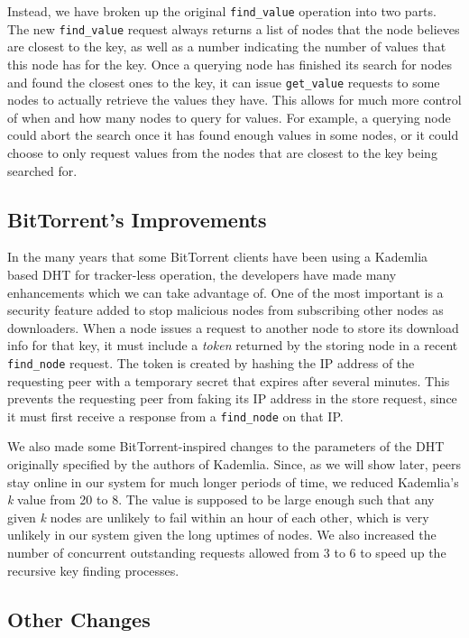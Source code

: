 \documentclass[conference]{IEEEtran}
\begin{document}
Instead, we have broken up the original \texttt{find\_value}
operation into two parts. The new \texttt{find\_value} request
always returns a list of nodes that the node believes are closest to
the key, as well as a number indicating the number of values that
this node has for the key. Once a querying node has finished its
search for nodes and found the closest ones to the key, it can issue
\texttt{get\_value} requests to some nodes to actually retrieve the
values they have. This allows for much more control of when and how
many nodes to query for values. For example, a querying node could
abort the search once it has found enough values in some nodes, or
it could choose to only request values from the nodes that are
closest to the key being searched for.

\subsection{BitTorrent's Improvements}
\label{bittorrent_dht}

In the many years that some BitTorrent clients have been using a
Kademlia based DHT for tracker-less operation, the developers have
made many enhancements which we can take advantage of. One of the
most important is a security feature added to stop malicious nodes
from subscribing other nodes as downloaders. When a node issues a
request to another node to store its download info for that key, it
must include a \emph{token} returned by the storing node in a recent
\texttt{find\_node} request. The token is created by hashing the IP
address of the requesting peer with a temporary secret that expires
after several minutes. This prevents the requesting peer from faking
its IP address in the store request, since it must first receive a
response from a \texttt{find\_node} on that IP.

We also made some BitTorrent-inspired changes to the parameters of
the DHT originally specified by the authors of Kademlia. Since, as
we will show later, peers stay online in our system for much longer
periods of time, we reduced Kademlia's \emph{k} value from 20 to 8.
The value is supposed to be large enough such that any given
\emph{k} nodes are unlikely to fail within an hour of each other,
which is very unlikely in our system given the long uptimes of
nodes. We also increased the number of concurrent outstanding
requests allowed from 3 to 6 to speed up the recursive key finding
processes.

\subsection{Other Changes}
\label{other_changes}
\end{document}
